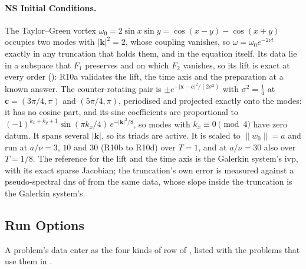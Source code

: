 \paragraph{NS Initial Conditions.} The Taylor--Green vortex $\omega_0=2\sin x\sin y=\cos(x-y)-\cos(x+y)$ occupies two modes with $|\mathbf k|^2=2$, whose coupling vanishes, so $\omega=\omega_0e^{-2\nu t}$ exactly in any truncation that holds them, and in the equation itself. Its data lie in a subspace that $F_1$ preserves and on which $F_2$ vanishes, so its lift is exact at every order (): R10a validates the lift, the time axis and the preparation at a known answer. The counter-rotating pair is $\pm e^{-|\mathbf x-\mathbf c|^2/(2\sigma^2)}$ with $\sigma^2=\tfrac14$ at $\mathbf c=(3\pi/4,\pi)$ and $(5\pi/4,\pi)$, periodised and projected exactly onto the modes: it has no cosine part, and its sine coefficients are proportional to $(-1)^{k_x+k_y+1}\sin(\pi k_x/4)\,e^{-|\mathbf k|^2/8}$, so modes with $k_x\equiv0\pmod4$ have zero datum. It spans several $|\mathbf k|$, so its triads are active. It is scaled to $\|w_0\|=a$ and run at $a/\nu=3$, $10$ and $30$ (R10b to R10d) over $T=1$, and at $a/\nu=30$ also over $T=1/8$. The reference for the lift and the time axis is the Galerkin system's \gls{ivp}, with its exact sparse Jacobian; the truncation's own error is measured against a pseudo-spectral \gls{dns} of  from the same data, whose slope inside the truncation is the Galerkin system's.

\subsection{Run Options}
\label{app:run-options}

A problem's data enter as the four kinds of row of , listed with the problems that use them in .

